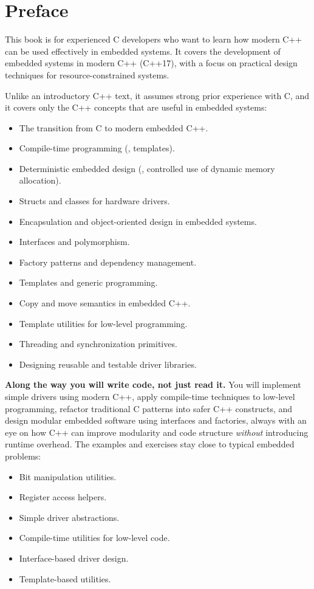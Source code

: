 
\chapter{Preface}

This book is for experienced C developers who want to learn how modern C++ can be used
effectively in embedded systems. It covers the development of embedded systems in modern C++
(C++17), with a focus on practical design techniques for resource-constrained systems.

Unlike an introductory C++ text, it assumes strong prior experience with C, and it covers only the
C++ concepts that are useful in embedded systems:
\begin{itemize}
  \item The transition from C to modern embedded C++.
  \item Compile-time programming (, templates).
  \item Deterministic embedded design (, controlled use of dynamic memory
    allocation).
  \item Structs and classes for hardware drivers.
  \item Encapsulation and object-oriented design in embedded systems.
  \item Interfaces and polymorphism.
  \item Factory patterns and dependency management.
  \item Templates and generic programming.
  \item Copy and move semantics in embedded C++.
  \item Template utilities for low-level programming.
  \item Threading and synchronization primitives.
  \item Designing reusable and testable driver libraries.
\end{itemize}

\textbf{Along the way you will write code, not just read it.} You will implement simple drivers
using modern C++, apply compile-time techniques to low-level programming, refactor traditional C
patterns into safer C++ constructs, and design modular embedded software using interfaces and
factories, always with an eye on how C++ can improve modularity and code structure
\emph{without} introducing runtime overhead. The examples and exercises stay close to typical
embedded problems:
\begin{itemize}
  \item Bit manipulation utilities.
  \item Register access helpers.
  \item Simple driver abstractions.
  \item Compile-time utilities for low-level code.
  \item Interface-based driver design.
  \item Template-based utilities.
\end{itemize}

